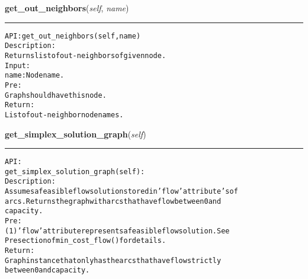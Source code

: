     \vspace{0.5ex}

\hspace{.8\funcindent}\begin{boxedminipage}{\funcwidth}

    \raggedright \textbf{get\_out\_neighbors}(\textit{self}, \textit{name})

    \vspace{-1.5ex}

    \rule{\textwidth}{0.5\fboxrule}
\setlength{\parskip}{2ex}
\begin{alltt}

API: get\_out\_neighbors(self, name)
Description:
Returns list of out-neighbors of given node.
Input:
    name: Node name.
Pre:
    Graph should have this node.
Return:
    List of out-neighbor node names.
\end{alltt}

\setlength{\parskip}{1ex}
    \end{boxedminipage}

    \label{coinor:gimpy:graph:Graph:get_simplex_solution_graph}

    \vspace{0.5ex}

\hspace{.8\funcindent}\begin{boxedminipage}{\funcwidth}

    \raggedright \textbf{get\_simplex\_solution\_graph}(\textit{self})

    \vspace{-1.5ex}

    \rule{\textwidth}{0.5\fboxrule}
\setlength{\parskip}{2ex}
\begin{alltt}

API:
    get\_simplex\_solution\_graph(self):
Description:
    Assumes a feasible flow solution stored in 'flow' attribute's of
    arcs. Returns the graph with arcs that have flow between 0 and
    capacity.
Pre:
    (1) 'flow' attribute represents a feasible flow solution. See
    Pre section of min\_cost\_flow() for details.
Return:
    Graph instance that only has the arcs that have flow strictly
    between 0 and capacity.
\end{alltt}

\setlength{\parskip}{1ex}
    \end{boxedminipage}

